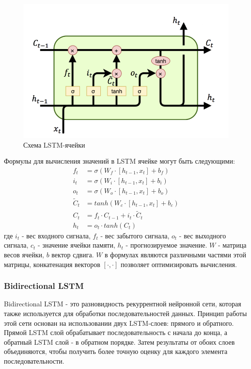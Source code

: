 \documentclass[diploma]{nanolab2015}
\begin{document}
\begin{figure}[ht]
    \centering
    \includegraphics[scale=0.7]{./assets/lstm-cell.png}
    \caption{Схема LSTM-ячейки}
    \label{pic1}
\end{figure}

Формулы для вычисления значений в LSTM ячейке могут быть следующими:
\begin{align*}
    f_t             & = \sigma(W_f \cdot [h_{t-1}, x_t] + b_f)        \\
    i_t             & = \sigma(W_i \cdot [h_{t-1}, x_t] + b_i)        \\
    o_t             & = \sigma(W_o \cdot [h_{t-1}, x_t] + b_o)        \\
    \widetilde{C}_t & = tanh(W_c \cdot [h_{t-1}, x_t] + b_c)          \\
    C_t             & = f_t \cdot C_{t-1} + i_t \cdot \widetilde{C}_t \\
    h_t             & = o_t \cdot tanh(C_t)
\end{align*}
где $i_t$ - вес входного сигнала, $f_t$ - вес забытого сигнала, $o_t$ - вес выходного сигнала, $c_t$ - значение ячейки памяти, $h_t$ - прогнозируемое значение. $W$ - матрица весов ячейки, $b$ вектор сдвига. $W$ в формулах являются различными частями этой матрицы, конкатенация векторов $[\cdot, \cdot]$ позволяет оптимизировать вычисления.

\subsubsection{Bidirectional LSTM}
Bidirectional LSTM - это разновидность рекуррентной нейронной сети, которая также используется для обработки последовательностей данных. Принцип работы этой сети основан на использовании двух LSTM-слоев: прямого и обратного.
Прямой LSTM слой обрабатывает последовательность с начала до конца, а обратный LSTM слой - в обратном порядке. Затем результаты от обоих слоев объединяются, чтобы получить более точную оценку для каждого элемента последовательности\cite{book9}.
\end{document}
